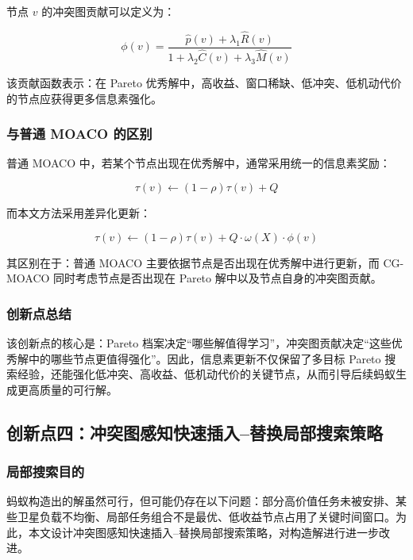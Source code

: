 \documentclass[UTF8,a4paper,12pt]{ctexart}
\begin{document}
节点 $v$ 的冲突图贡献可以定义为：

\begin{equation}
\phi(v)=
\frac{\hat{p}(v)+\lambda_1\hat{R}(v)}
{1+\lambda_2\hat{C}(v)+\lambda_3\hat{M}(v)}
\end{equation}

该贡献函数表示：在 Pareto 优秀解中，高收益、窗口稀缺、低冲突、低机动代价的节点应获得更多信息素强化。

\subsubsection{与普通 MOACO 的区别}

普通 MOACO 中，若某个节点出现在优秀解中，通常采用统一的信息素奖励：

\begin{equation}
\tau(v)\leftarrow (1-\rho)\tau(v)+Q
\end{equation}

而本文方法采用差异化更新：

\begin{equation}
\tau(v)\leftarrow (1-\rho)\tau(v)+Q\cdot \omega(X)\cdot \phi(v)
\end{equation}

其区别在于：普通 MOACO 主要依据节点是否出现在优秀解中进行更新，而 CG-MOACO 同时考虑节点是否出现在 Pareto 解中以及节点自身的冲突图贡献。

\subsubsection{创新点总结}

该创新点的核心是：Pareto 档案决定``哪些解值得学习''，冲突图贡献决定``这些优秀解中的哪些节点更值得强化''。因此，信息素更新不仅保留了多目标 Pareto 搜索经验，还能强化低冲突、高收益、低机动代价的关键节点，从而引导后续蚂蚁生成更高质量的可行解。

\subsection{创新点四：冲突图感知快速插入--替换局部搜索策略}

\subsubsection{局部搜索目的}

蚂蚁构造出的解虽然可行，但可能仍存在以下问题：部分高价值任务未被安排、某些卫星负载不均衡、局部任务组合不是最优、低收益节点占用了关键时间窗口。为此，本文设计冲突图感知快速插入--替换局部搜索策略，对构造解进行进一步改进。
\end{document}
